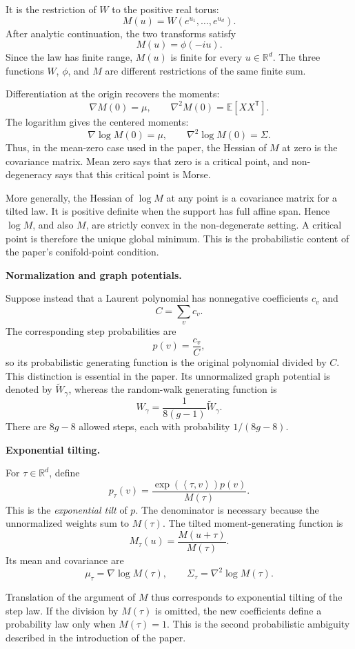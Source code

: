 It is the restriction of $W$ to the
positive real torus:
$$
M(u)=W(e^{u_1},\ldots,e^{u_d}).
$$
After analytic continuation, the two
transforms satisfy
$$
M(u)=\phi(-iu).
$$
Since the law has finite range, $M(u)$ is
finite for every $u\in\mathbb R^d$. The
three functions $W$, $\phi$, and $M$ are
different restrictions of the same finite
sum.

Differentiation at the origin recovers the
moments:
$$
\nabla M(0)=\mu,
\qquad
\nabla^2M(0)=\mathbb E[XX^{\mathsf T}].
$$
The logarithm gives the centered moments:
$$
\nabla\log M(0)=\mu,
\qquad
\nabla^2\log M(0)=\Sigma.
$$
Thus, in the mean-zero case used in the
paper, the Hessian of $M$ at zero is the
covariance matrix. Mean zero says that
zero is a critical point, and
non-degeneracy says that this critical
point is Morse.

More generally, the Hessian of $\log M$ at
any point is a covariance matrix for a
tilted law. It is positive definite when
the support has full affine span. Hence
$\log M$, and also $M$, are strictly convex
in the non-degenerate setting. A critical
point is therefore the unique global
minimum. This is the probabilistic content
of the paper's conifold-point condition.

\medskip\noindent
{\bf Normalization and graph potentials.}

Suppose instead that a Laurent polynomial
has nonnegative coefficients $c_v$ and
$$
C=\sum_v c_v.
$$
The corresponding step probabilities are
$$
p(v)=\frac{c_v}{C},
$$
so its probabilistic generating function is
the original polynomial divided by $C$.
This distinction is essential in the
paper. Its unnormalized graph potential is
denoted by $\widetilde W_\gamma$, whereas
the random-walk generating function is
$$
W_\gamma
=\frac{1}{8(g-1)}
 \widetilde W_\gamma.
$$
There are $8g-8$ allowed steps, each with
probability $1/(8g-8)$.

\medskip\noindent
{\bf Exponential tilting.}

For $\tau\in\mathbb R^d$, define
$$
p_\tau(v)
=\frac{
 \exp(\left\langle{}
 \tau,v\right\rangle{})p(v)}
 {M(\tau)}.
$$
This is the \emph{exponential tilt} of
$p$. The denominator is necessary because
the unnormalized weights sum to $M(\tau)$.
The tilted moment-generating function is
$$
M_\tau(u)=\frac{M(u+\tau)}{M(\tau)}.
$$
Its mean and covariance are
$$
\mu_\tau=\nabla\log M(\tau),
\qquad
\Sigma_\tau=\nabla^2\log M(\tau).
$$

Translation of the argument of $M$ thus
corresponds to exponential tilting of the
step law. If the division by $M(\tau)$ is
omitted, the new coefficients define a
probability law only when $M(\tau)=1$.
This is the second probabilistic ambiguity
described in the introduction of the
paper.

